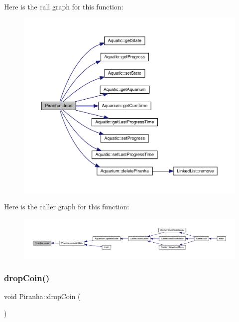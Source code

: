 Here is the call graph for this function\+:\nopagebreak
\begin{figure}[H]
\begin{center}
\leavevmode
\includegraphics[width=350pt]{class_piranha_a1f30b46fb909558c44eba327e99d5f2e_cgraph}
\end{center}
\end{figure}
Here is the caller graph for this function\+:
\nopagebreak
\begin{figure}[H]
\begin{center}
\leavevmode
\includegraphics[width=350pt]{class_piranha_a1f30b46fb909558c44eba327e99d5f2e_icgraph}
\end{center}
\end{figure}
\mbox{\label{class_piranha_aee107987f36631002f04c5283564382b}} 
\subsubsection{\texorpdfstring{drop\+Coin()}{dropCoin()}}
{\footnotesize\ttfamily void Piranha\+::drop\+Coin (\begin{DoxyParamCaption}{ }\end{DoxyParamCaption})\hspace{0.3cm}{\ttfamily [virtual]}}




